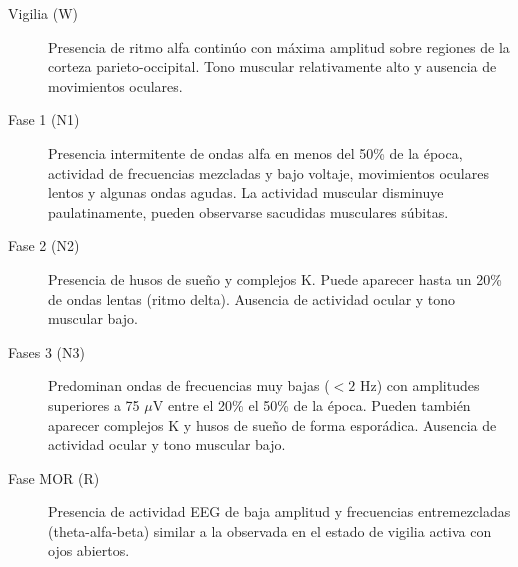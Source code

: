 \begin{description}
\item[Vigilia (W)] Presencia de ritmo alfa contin\'uo con m\'axima amplitud sobre regiones de la 
corteza parieto-occipital. Tono muscular relativamente alto y ausencia de movimientos oculares.

\item[Fase 1 (N1)] 
Presencia intermitente de ondas alfa en menos del 50\% de la \'epoca, actividad de frecuencias 
mezcladas y bajo voltaje, movimientos oculares lentos y algunas ondas agudas. 
La actividad muscular disminuye paulatinamente, pueden observarse sacudidas musculares s\'ubitas.

\item[Fase 2 (N2)] Presencia de 
husos de sue\~no y complejos K. 
Puede aparecer hasta un 20\% de ondas lentas (ritmo delta). Ausencia de actividad ocular y tono 
muscular bajo.

\item[Fases 3 (N3)] Predominan ondas de frecuencias muy bajas ($<2$ Hz) con amplitudes superiores a 
75 $\mu$V entre el 20\% el 50\% de la \'epoca. Pueden tambi\'en aparecer complejos K y 
husos de sue\~no de forma espor\'adica. Ausencia de actividad ocular y tono muscular bajo.


\item[Fase MOR (R)] Presencia de actividad EEG de baja amplitud y frecuencias entremezcladas 
(theta-alfa-beta) similar a la observada en el estado de vigilia activa con ojos abiertos.
\end{description}


